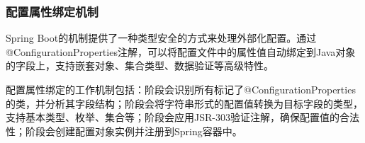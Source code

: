 \hypertarget{ux914dux7f6eux5c5eux6027ux7ed1ux5b9aux673aux5236}{%
\subsubsection{配置属性绑定机制}\label{ux914dux7f6eux5c5eux6027ux7ed1ux5b9aux673aux5236}}

Spring Boot的机制提供了一种类型安全的方式来处理外部化配置。通过@ConfigurationProperties注解，可以将配置文件中的属性值自动绑定到Java对象的字段上，支持嵌套对象、集合类型、数据验证等高级特性。

配置属性绑定的工作机制包括：阶段会识别所有标记了@ConfigurationProperties的类，并分析其字段结构；阶段会将字符串形式的配置值转换为目标字段的类型，支持基本类型、枚举、集合等；阶段会应用JSR-303验证注解，确保配置值的合法性；阶段会创建配置对象实例并注册到Spring容器中。


